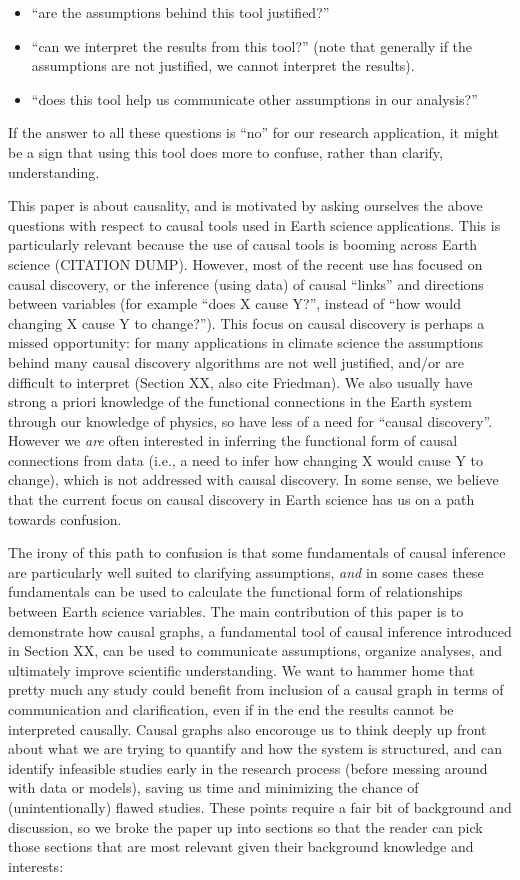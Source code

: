 \documentclass[12pt]{article}
\begin{document}
\begin{itemize}
\item ``are the assumptions behind this tool justified?''
\item ``can we interpret the results from this tool?'' (note that
  generally if the assumptions are not justified, we cannot interpret
  the results).
\item ``does this tool help us communicate other assumptions in our analysis?''
\end{itemize}

If the answer to all these questions is ``no'' for our research
application, it might be a sign that using this tool does more to
confuse, rather than clarify, understanding.

This paper is about causality, and is motivated by asking ourselves
the above questions with respect to causal tools used in Earth science
applications. This is particularly relevant because the use of causal
tools is booming across Earth science (CITATION DUMP). However, most
of the recent use has focused on causal discovery, or the inference
(using data) of causal ``links'' and directions between variables (for
example ``does X cause Y?'', instead of ``how would changing X cause Y
to change?''). This focus on causal discovery is perhaps a missed
opportunity: for many applications in climate science the assumptions
behind many causal discovery algorithms are not well justified, and/or
are difficult to interpret (Section XX, also cite Friedman). We also
usually have strong a priori knowledge of the functional connections
in the Earth system through our knowledge of physics, so have less of
a need for ``causal discovery''. However we \textit{are} often
interested in inferring the functional form of causal connections from
data (i.e., a need to infer how changing X would cause Y to change),
which is not addressed with causal discovery. In some sense, we
believe that the current focus on causal discovery in Earth science
has us on a path towards confusion.

The irony of this path to confusion is that some fundamentals of
causal inference are particularly well suited to clarifying
assumptions, \textit{and} in some cases these fundamentals can be used
to calculate the functional form of relationships between Earth
science variables. The main contribution of this paper is to
demonstrate how causal graphs, a fundamental tool of causal inference
introduced in Section XX, can be used to communicate assumptions,
organize analyses, and ultimately improve scientific understanding. We
want to hammer home that pretty much any study could benefit from
inclusion of a causal graph in terms of communication and
clarification, even if in the end the results cannot be interpreted
causally. Causal graphs also encorouge us to think deeply up front
about what we are trying to quantify and how the system is structured,
and can identify infeasible studies early in the research process
(before messing around with data or models), saving us time and
minimizing the chance of (unintentionally) flawed studies. These
points require a fair bit of background and discussion, so we broke
the paper up into sections so that the reader can pick those sections
that are most relevant given their background knowledge and interests:
\end{document}
